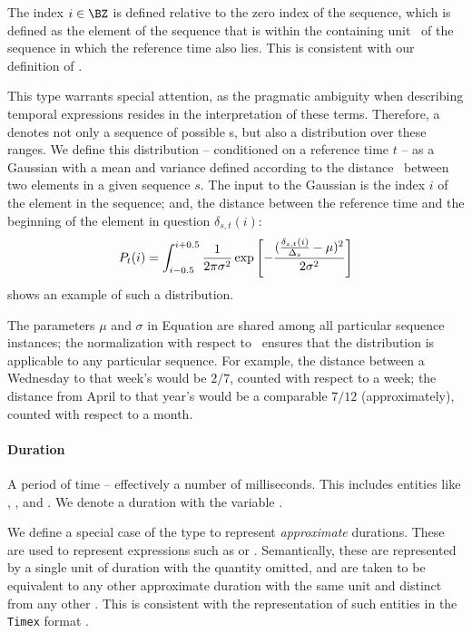 The index $i \in \BZ$ is defined relative to the zero index of the sequence,
	which is defined as the element of the sequence
	that is within the containing unit \seqcanon\ of the sequence in which the 
	reference time also lies.
This is consistent with our definition of \seqelem.

This type warrants special attention, as the pragmatic ambiguity when
	describing temporal expressions resides in the interpretation of these
	terms.
Therefore, a  denotes not only a sequence of possible
	s, but also a distribution over these ranges.
We define this distribution -- conditioned on a reference time $t$ --
	as a Gaussian with a mean and variance defined according
	to the distance \seqjump\ between two elements in a given sequence $s$.
The input to the Gaussian is the index $i$ of the element in the sequence;
	and, the distance between the reference time and the beginning
	of the element in question $\delta_{s,t}(i)$:
\begin{equation}
\label{eqn:gaussian}
	P_t(i) = 
	\int_{i-0.5}^{i+0.5}
		\frac{1}{2\pi\sigma^2} 
			\exp\left[-\frac{
					(\frac{\delta_{s,t}(i)}{\Delta_s} - \mu)^2
				}{
					2\sigma^2
				}
			\right]
\end{equation}
\needfig shows an example of such a distribution.

The parameters $\mu$ and $\sigma$ in Equation  are shared
	among all particular sequence instances; the normalization
	with respect to \seqjump\ ensures that the distribution is applicable
	to any particular sequence.
For example, the distance between a Wednesday to that week's 
	would be $2/7$, counted with respect to a week; 
	the distance from April to that year's  would be a 
	comparable $7/12$ (approximately), counted with respect to a month.
	
\paragraph{Duration}
A period of time -- effectively a number of milliseconds.
This includes entities like , , and .
We denote a duration with the variable \dur.

We define a special case of the  type to represent 
	\textit{approximate} durations.
These are used to represent expressions such as  or
	.
Semantically, these are represented by a single unit of duration with the
	quantity omitted, and are taken to be equivalent to any other approximate
	duration with the same unit and distinct from any other .
This is consistent with the representation of such entities in the
	\texttt{Timex} format \cite{key:2003pustejovsky-timeml}.

